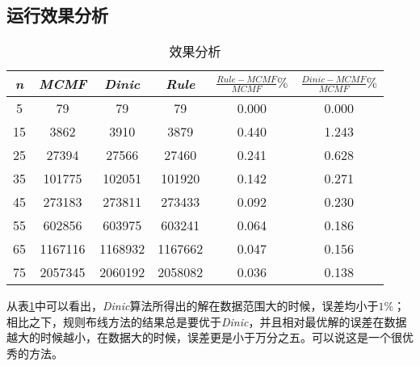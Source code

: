\subsection{运行效果分析}

\begin{table}[H]
\label{tab:2}
\centering
\begin{tabular}{|c|c|c|c|c|c|}
\hline
\emph{n} & \emph{MCMF} & \emph{Dinic} & \emph{Rule} & $\frac{Rule-MCMF}{MCMF}\%$&$\frac{Dinic-MCMF}{MCMF}\%$\\
\hline
5 & 79 & 79 & 79 & 0.000&0.000 \\
\hline
15 & 3862&3910&3879&0.440&1.243 \\
\hline
25 & 27394	&   27566	 &  27460	&0.241& 0.628\\
\hline
35 &101775	&  102051	&  101920	&	0.142&0.271\\
\hline
45 & 273183	 & 273811	&  273433	&	0.092 &0.230\\
\hline
55 & 602856	 & 603975	&  603241	&0.064 &0.186\\
\hline
65 & 1167116	& 1168932	& 1167662	&	0.047&0.156\\
\hline
75 & 2057345	& 2060192	& 2058082	&	0.036&0.138\\
\hline
\end{tabular}
\caption{效果分析}
\end{table}

\qquad 从表\ref{tab:2}中可以看出，\emph{Dinic}算法所得出的解在数据范围大的时候，误差均小于$1\%$；相比之下，规则布线方法的结果总是要优于\emph{Dinic}，并且相对最优解的误差在数据越大的时候越小，在数据大的时候，误差更是小于万分之五。可以说这是一个很优秀的方法。
